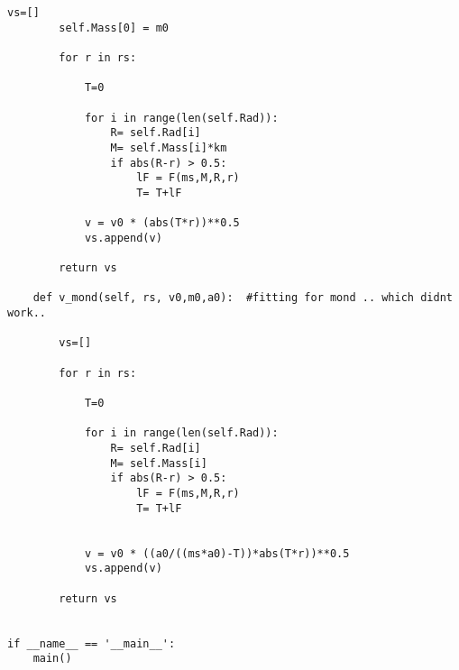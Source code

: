 \begin{Verbatim}[fontsize=\small,baselinestretch=0.9]
        vs=[]
        self.Mass[0] = m0

        for r in rs:

            T=0

            for i in range(len(self.Rad)):
                R= self.Rad[i]
                M= self.Mass[i]*km
                if abs(R-r) > 0.5:
                    lF = F(ms,M,R,r)
                    T= T+lF

            v = v0 * (abs(T*r))**0.5
            vs.append(v)

        return vs

    def v_mond(self, rs, v0,m0,a0):  #fitting for mond .. which didnt work..

        vs=[]

        for r in rs:

            T=0

            for i in range(len(self.Rad)):
                R= self.Rad[i]
                M= self.Mass[i]
                if abs(R-r) > 0.5:
                    lF = F(ms,M,R,r)
                    T= T+lF


            v = v0 * ((a0/((ms*a0)-T))*abs(T*r))**0.5
            vs.append(v)

        return vs


if __name__ == '__main__':
    main()
\end{Verbatim}
